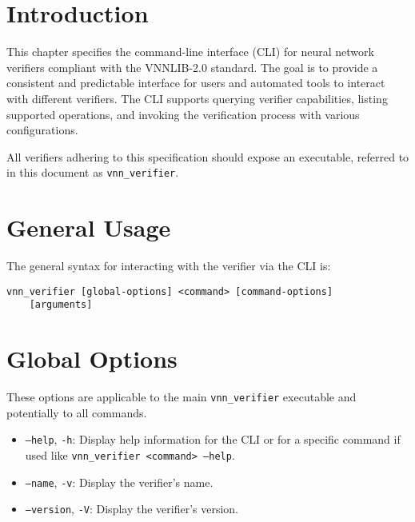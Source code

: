 

\section{Introduction}
This chapter specifies the command-line interface (CLI) for neural network verifiers compliant with the VNNLIB-2.0 standard. The goal is to provide a consistent and 
predictable interface for users and automated tools to interact with different verifiers. The CLI supports querying verifier capabilities, listing supported operations, 
and invoking the verification process with various configurations.

All verifiers adhering to this specification should expose an executable, referred to in this document as \texttt{vnn\_verifier}.

\section{General Usage}
The general syntax for interacting with the verifier via the CLI is:
\begin{lstlisting}[style=bash, numbers=none, frame=none, backgroundcolor=\color{white}]
vnn_verifier [global-options] <command> [command-options] 
	[arguments] \end{lstlisting}

\section{Global Options}
These options are applicable to the main \texttt{vnn\_verifier} executable and potentially to all commands.
\begin{itemize}
    \item \texttt{--help}, \texttt{-h}: Display help information for the CLI or for a specific command if used like \texttt{vnn\_verifier <command> --help}.
    \item \texttt{--name}, \texttt{-v}: Display the verifier's name.
    \item \texttt{--version}, \texttt{-V}: Display the verifier's version.
\end{itemize}

